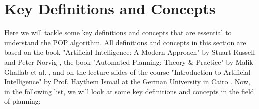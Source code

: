 


\section{Key Definitions and Concepts}\label{sec:key_definitions}
Here we will tackle some key definitions and concepts that are essential to understand the \ac{POP} algorithm.
All definitions and concepts in this section are based on the book "Artificial Intelligence: A Modern Approach" by Stuart Russell and Peter Norvig \cite{RN2020}, the book "Automated Planning: Theory \& Practice" by Malik Ghallab et al. \cite{10.5555/975615}, and on the lecture slides of the course "Introduction to Artificial Intelligence" by Prof. Haythem Ismail at the German University in Cairo \cite{Ismail2023}.
Now, in the following list, we will look at some key definitions and concepts in the field of planning:
